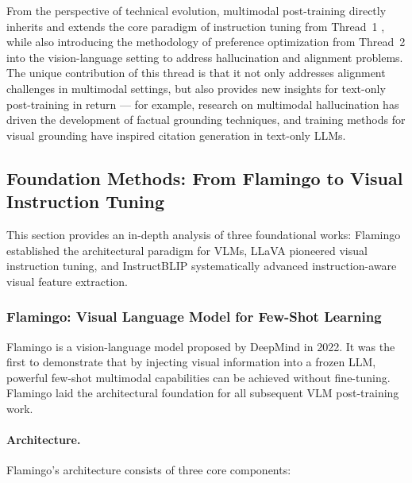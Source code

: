 \noindent
From the perspective of technical evolution, multimodal post-training directly inherits and extends
the core paradigm of instruction tuning from Thread~1
,
while also introducing the methodology of preference optimization from Thread~2
into the vision-language setting to address hallucination and alignment problems.
The unique contribution of this thread is that
it not only addresses alignment challenges in multimodal settings,
but also provides new insights for text-only post-training in return ---
for example, research on multimodal hallucination has driven the development of factual grounding techniques,
and training methods for visual grounding have inspired citation generation in text-only LLMs.

\subsection{Foundation Methods: From Flamingo to Visual Instruction Tuning}
\label{sec:t5-foundation}

This section provides an in-depth analysis of three foundational works:
Flamingo \cite{alayrac2022flamingo} established the architectural paradigm for VLMs,
LLaVA \cite{liu2023llava} pioneered visual instruction tuning,
and InstructBLIP \cite{dai2023instructblip} systematically advanced instruction-aware visual feature extraction.

\subsubsection{Flamingo: Visual Language Model for Few-Shot Learning}
\label{sec:t5-flamingo}

Flamingo \cite{alayrac2022flamingo} is a vision-language model proposed by DeepMind in 2022.
It was the first to demonstrate that by injecting visual information into a frozen LLM,
powerful few-shot multimodal capabilities can be achieved without fine-tuning.
Flamingo laid the architectural foundation for all subsequent VLM post-training work.

\paragraph{Architecture.}
Flamingo's architecture consists of three core components:


